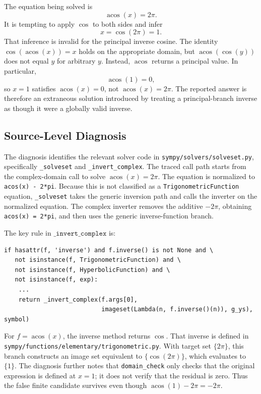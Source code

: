 \documentclass[11pt]{article}
\begin{document}
The equation being solved is
\[
  \operatorname{acos}(x) = 2\pi.
\]
It is tempting to apply \(\cos\) to both sides and infer
\[
  x = \cos(2\pi) = 1.
\]
That inference is invalid for the principal inverse cosine.  The identity
\(\cos(\operatorname{acos}(x)) = x\) holds on the appropriate domain, but \(\operatorname{acos}(\cos(y))\)
does not equal \(y\) for arbitrary \(y\).  Instead, \(\operatorname{acos}\) returns a
principal value.  In particular,
\[
  \operatorname{acos}(1) = 0,
\]
so \(x = 1\) satisfies \(\operatorname{acos}(x) = 0\), not \(\operatorname{acos}(x) = 2\pi\).  The reported
answer is therefore an extraneous solution introduced by treating a
principal-branch inverse as though it were a globally valid inverse.

\subsection{Source-Level Diagnosis}

\begin{sloppypar}
The diagnosis identifies the relevant solver code in
\nolinkurl{sympy/solvers/solveset.py}, specifically
\texttt{\_solveset} and \texttt{\_invert\_complex}.  The traced call path starts
from the complex-domain call to solve \(\operatorname{acos}(x) = 2\pi\).  The
equation is normalized to \texttt{acos(x) - 2*pi}.  Because this is not
classified as a \texttt{TrigonometricFunction} equation, \texttt{\_solveset}
takes the generic inversion path and calls the inverter on the normalized
equation.  The complex inverter removes the additive \(-2\pi\), obtaining
\texttt{acos(x) = 2*pi}, and then uses the generic inverse-function branch.
\end{sloppypar}

The key rule in \(\texttt{\_invert\_complex}\) is:

\begin{lstlisting}[style=bugpython]
if hasattr(f, 'inverse') and f.inverse() is not None and \
   not isinstance(f, TrigonometricFunction) and \
   not isinstance(f, HyperbolicFunction) and \
   not isinstance(f, exp):
    ...
    return _invert_complex(f.args[0],
                           imageset(Lambda(n, f.inverse()(n)), g_ys), symbol)
\end{lstlisting}

For \(f = \operatorname{acos}(x)\), the inverse method returns \(\cos\).  That
inverse is defined in \nolinkurl{sympy/functions/elementary/trigonometric.py}.
With target set \(\{2\pi\}\), this branch constructs an image set equivalent to
\(\{\cos(2\pi)\}\), which evaluates to \(\{1\}\).  The diagnosis further notes
that \texttt{domain\_check} only checks that the original expression is defined
at \(x = 1\); it does not verify that the residual is zero.  Thus the false
finite candidate survives even though
\(\operatorname{acos}(1) - 2\pi = -2\pi\).
\end{document}
